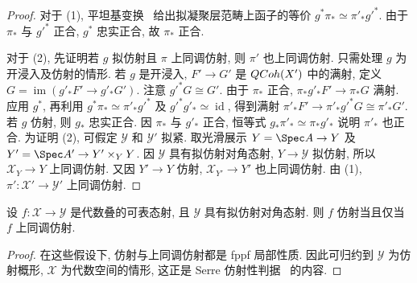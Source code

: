 \begin{proof}
对于 (1), 平坦基变换~ 给出拟凝聚层范畴上函子的等价 $g^*\pi_*\simeq\pi'_*g'^*$. 由于 $\pi_*$ 与 $g'^*$ 正合, $g^*$ 忠实正合, 故 $\pi_*$ 正合.

对于 (2), 先证明若 $g$ 拟仿射且 $\pi$ 上同调仿射, 则 $\pi'$ 也上同调仿射. 只需处理 $g$ 为开浸入及仿射的情形. 若 $g$ 是开浸入, $F'\to G'$ 是 $QCoh(X')$ 中的满射, 定义 $G=\operatorname{im}(g'_*F'\to g'_*G')$. 注意 $g'^*G\cong G'$. 由于 $\pi_*$ 正合, $\pi_*g'_*F'\to\pi_*G$ 满射. 应用 $g^*$, 再利用 $g^*\pi_*\simeq\pi'_*g'^*$ 及 $g'^*g'_*\simeq\operatorname{id}$, 得到满射 $\pi'_*F'\to\pi'_*g'^*G\cong\pi'_*G'$. 若 $g$ 仿射, 则 $g_*$ 忠实正合. 因 $\pi_*$ 与 $g'_*$ 正合, 恒等式 $g_*\pi'_*\simeq\pi_*g'_*$ 说明 $\pi'_*$ 也正合. 为证明 (2), 可假定 $\mathcal Y$ 和 $\mathcal Y'$ 拟紧. 取光滑展示 $Y=\Spec A\to\mathcal Y$ 及 $Y'=\Spec A'\to\mathcal Y'\times_{\mathcal Y}Y$. 因 $\mathcal Y$ 具有拟仿射对角态射, $Y\to\mathcal Y$ 拟仿射, 所以 $\mathcal X_Y\to Y$ 上同调仿射. 又因 $Y'\to Y$ 仿射, $\mathcal X_{Y'}\to Y'$ 也上同调仿射. 由 (1), $\pi':\mathcal X'\to\mathcal Y'$ 上同调仿射.
\end{proof}
\begin{corollary}\label{src:7.5.20}
设 $f:\mathcal X\to\mathcal Y$ 是代数叠的可表态射, 且 $\mathcal Y$ 具有拟仿射对角态射. 则 $f$ 仿射当且仅当 $f$ 上同调仿射.
\end{corollary}
\begin{proof}
在这些假设下, 仿射与上同调仿射都是 fppf 局部性质. 因此可归约到 $\mathcal Y$ 为仿射概形, $\mathcal X$ 为代数空间的情形, 这正是 Serre 仿射性判据~ 的内容.
\end{proof}

